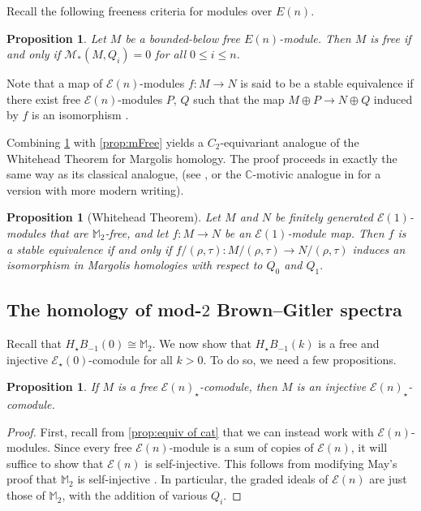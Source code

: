 \documentclass{amsart}
\newtheorem{proposition}[equation]{Proposition}
\theoremstyle{plain}
\numberwithin{equation}{section}
\numberwithin{figure}{section}
\newcommand{\mM}{{\mathbb M}}
\newcommand{\cE}{{\mathcal E}}
\newcommand{\cM}{{\mathcal M}}
\newcommand{\0}{\langle 0 \rangle }
\begin{document}
Recall the following freeness criteria for modules over $E(n)$.
\begin{proposition}\cite[Thm~18.8]{margolis2011spectra}\label{classical freeness}
Let $M$ be a bounded-below free $E(n)$-module. Then $M$ is free if and only if $\cM_{*}(M, Q_{i}) = 0$ for all $0 \le i \le n$. 
\end{proposition}
Note that a map of $\cE(n)$-modules $f:M \to N$ is said to be a stable equivalence if there exist free $\cE(n)$-modules $P$, $Q$ such that the map $M \oplus P \to N \oplus Q$ induced by $f$ is an isomorphism \cite[p.205]{margolis2011spectra}. 

Combining \cref{classical freeness} with \cref{prop:mFree} yields a $C_{2}$-equivariant analogue of the Whitehead Theorem for Margolis homology. The proof proceeds in exactly the same way as its classical analogue, (see \cite[Thm~18.8~ii]{margolis2011spectra}, or the $\mathbb{C}$-motivic analogue in \cite[Cor~4.10]{GheorgheIsaksenRicka18} for a version with more modern writing). 
\begin{proposition}[Whitehead Theorem]\label{prop:EquivWhitehead} 
Let $M$ and $N$ be finitely generated $\cE(1)$-modules that are $\mM_2$-free, and let $f: M \to N$ be an $\cE(1)$-module map. Then $f$ is a stable equivalence if and only if $f/(\rho,\tau):M/(\rho,\tau) \to N/(\rho,\tau)$ induces an isomorphism in Margolis homologies with respect to $Q_0$ and $Q_1.$
\end{proposition}

\subsection{The homology of mod-$2$ Brown--Gitler spectra}
Recall that $H_{\star}B_{-1}(0)\cong \mM_{2}$. We now show that $H_{\star}B_{-1}(k)$ is a free and injective $\cE_{\star}(0)$-comodule for all $k>0$. To do so, we need a few propositions.

\begin{proposition}\label{equiv:free:inj}
If $M$ is a free $\cE(n)_{\star}$-comodule, then $M$ is an injective $\cE(n)_{\star}$-comodule. 
\end{proposition}
\begin{proof}
    First, recall from \cref{prop:equiv of cat} that we can instead work with $\cE(n)$-modules. Since every free $\cE(n)$-module is a sum of copies of $\cE(n)$, it will suffice to show that $\cE(n)$ is self-injective. This follows from modifying May's proof that $\mM_{2}$ is self-injective \cite[Appendix]{May20}. In particular, the graded ideals of $\cE(n)$ are just those of $\mM_{2}$, with the addition of various $Q_{i}$. 
\end{proof}
\end{document}
